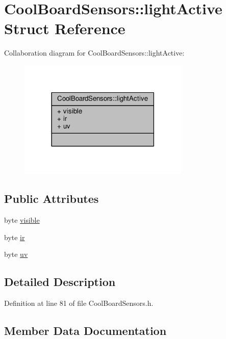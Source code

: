 \hypertarget{structCoolBoardSensors_1_1lightActive}{}\section{Cool\+Board\+Sensors\+:\+:light\+Active Struct Reference}
\label{structCoolBoardSensors_1_1lightActive}


Collaboration diagram for Cool\+Board\+Sensors\+:\+:light\+Active\+:
\nopagebreak
\begin{figure}[H]
\begin{center}
\leavevmode
\includegraphics[width=230pt]{structCoolBoardSensors_1_1lightActive__coll__graph}
\end{center}
\end{figure}
\subsection*{Public Attributes}
\begin{DoxyCompactItemize}
\item 
byte \hyperlink{structCoolBoardSensors_1_1lightActive_abcbba296b6a95e67c0cd2555d9dd50c7}{visible}
\item 
byte \hyperlink{structCoolBoardSensors_1_1lightActive_a67700895349b95ceb263f1a6da756315}{ir}
\item 
byte \hyperlink{structCoolBoardSensors_1_1lightActive_a949a7aaf5166d981de8fe0fd93da20d6}{uv}
\end{DoxyCompactItemize}


\subsection{Detailed Description}


Definition at line 81 of file Cool\+Board\+Sensors.\+h.



\subsection{Member Data Documentation}
\mbox{\label{structCoolBoardSensors_1_1lightActive_a67700895349b95ceb263f1a6da756315}} 
